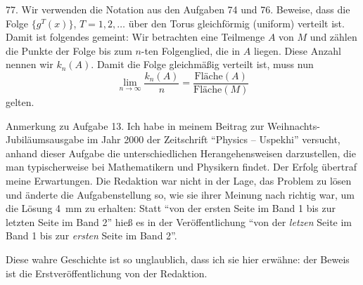 \begin{problem}{77.}
	Wir verwenden die Notation aus den Aufgaben 74 und 76. Beweise, dass die Folge $\{g^T (x)\}$, $T=1, 2, \dotsc$ über den Torus gleichförmig (uniform) verteilt ist. Damit ist folgendes gemeint:
	Wir betrachten eine Teilmenge $A$ von $M$ und zählen die Punkte der Folge bis zum $n$-ten Folgenglied, die in $A$ liegen. Diese Anzahl nennen wir $k_n(A)$.
	Damit die Folge gleichmäßig verteilt ist, muss nun
	\begin{equation*}
		\lim_{n \to \infty} \frac{k_n(A)}{n}=\frac{{\text{Fläche}} (A)}{{\text{Fläche}} (M)}
	\end{equation*}
	gelten.
\end{problem}

\vfill

\begin{note}{Anmerkung zu Aufgabe 13.}
	Ich habe in meinem Beitrag zur Weih\-nachts-Jubiläumsausgabe im Jahr 2000 der Zeitschrift \enquote{Physics -- Uspe\-khi} versucht, anhand dieser Aufgabe die unterschiedlichen Herangehensweisen darzustellen, die man typischerweise bei Mathematikern und Physikern findet. Der Erfolg übertraf meine Erwartungen. Die Redaktion war nicht in der Lage, das Problem zu lösen und änderte die Aufgabenstellung so, wie sie ihrer Meinung nach richtig war, um die Lösung \SI{4}{\mm} zu erhalten: Statt \enquote{von der ersten Seite im Band 1 bis zur letzten Seite im Band 2} hieß es in der Veröffentlichung \enquote{von der \emph{letzen} Seite im Band 1 bis zur \emph{ersten} Seite im Band 2}.

	Diese wahre Geschichte ist so unglaublich, dass ich sie hier erwähne: der Beweis ist die Erstveröffentlichung von der Redaktion.
\end{note}
\clearpage

